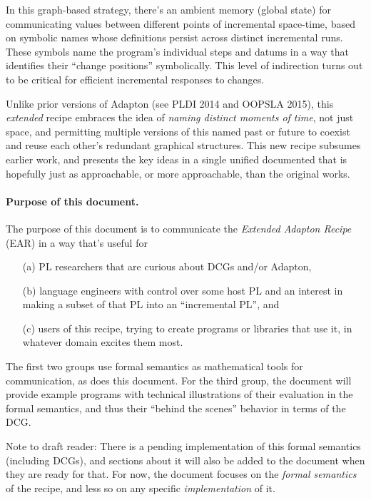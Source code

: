 \documentclass[11pt]{article}
\begin{document}
In this graph-based strategy, there's an ambient memory (global state)
for communicating values between different points of incremental
space-time, based on symbolic names whose definitions persist across
distinct incremental runs.
%
These symbols name the program's individual steps and datums in a way
that identifies their ``change positions'' symbolically.
%
This level of indirection turns out to be critical for efficient
incremental responses to changes.

Unlike prior versions of Adapton (see PLDI 2014 and OOPSLA 2015), this
\emph{extended} recipe embraces the idea of \emph{naming distinct
moments of time}, not just space, and permitting multiple versions of
this named past or future to coexist and reuse each other's redundant
graphical structures.
%
This new recipe subsumes earlier work, and presents the key ideas in a
single unified documented that is hopefully just as approachable, or
more approachable, than the original works.

\paragraph{Purpose of this document.}
%
The purpose of this document is to communicate the \emph{Extended Adapton Recipe} (EAR) in a way that's useful for\begin{itemize}
\item[(a)] PL researchers that are curious about DCGs and/or Adapton,
\item[(b)] language engineers with control over some host PL and an interest in making a subset of that PL into an ``incremental PL'', and
\item[(c)] users of this recipe, trying to create programs or libraries that use it, in whatever domain excites them most.
\end{itemize}

The first two groups use formal semantics as mathematical tools for communication, as does this document.
%
For the third group, the document will provide example programs with technical illustrations of
their evaluation in the formal semantics, and thus their ``behind the scenes'' behavior in terms of the DCG.

Note to draft reader: There is a pending implementation of this formal
semantics (including DCGs), and sections about it will also be added to the document
when they are ready for that. For now, the document focuses on the
\emph{formal semantics} of the recipe, and less so on any specific
\emph{implementation} of it.
  
\end{document}
